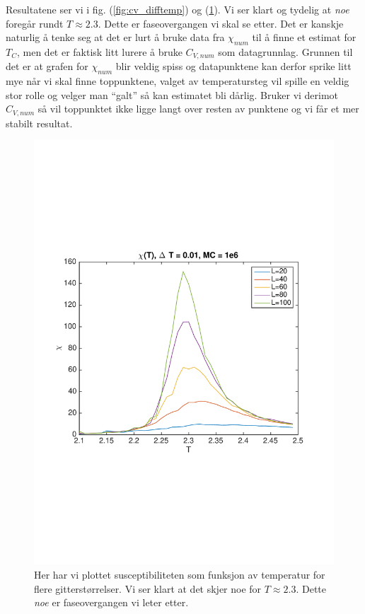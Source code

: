 \documentclass[norsk, 10pt]{article}
\begin{document}
Resultatene ser vi i fig. (\ref{fig:cv_difftemp}) og (\ref{fig:chi_difftemp}). Vi ser klart og tydelig at \emph{noe} foregår rundt $T\approx 2.3$. Dette er faseovergangen vi skal se etter. Det er kanskje naturlig å tenke seg at det er lurt å bruke data fra $\chi_{num}$ til å finne et estimat for $T_C$, men det er faktisk litt lurere å bruke $C_{V,num}$ som datagrunnlag. Grunnen til det er at grafen for $\chi_{num}$ blir veldig spiss og datapunktene kan derfor sprike litt mye når vi skal finne toppunktene, valget av temperatursteg vil spille en veldig stor rolle og velger man ``galt'' så kan estimatet bli dårlig. Bruker vi derimot $C_{V,num}$ så vil toppunktet ikke ligge langt over resten av punktene og vi får et mer stabilt resultat.

\begin{figure}[H]
	\centering
	\includegraphics[scale = 0.5, trim = 1cm 8cm 1cm 8cm]{chi_difftemp.pdf}
	\caption{Her har vi plottet susceptibiliteten som funksjon av temperatur for flere gitterstørrelser. Vi ser klart at det skjer noe for $T\approx 2.3$. Dette \emph{noe} er faseovergangen vi leter etter.}
	\label{fig:chi_difftemp}
\end{figure}
\end{document}
